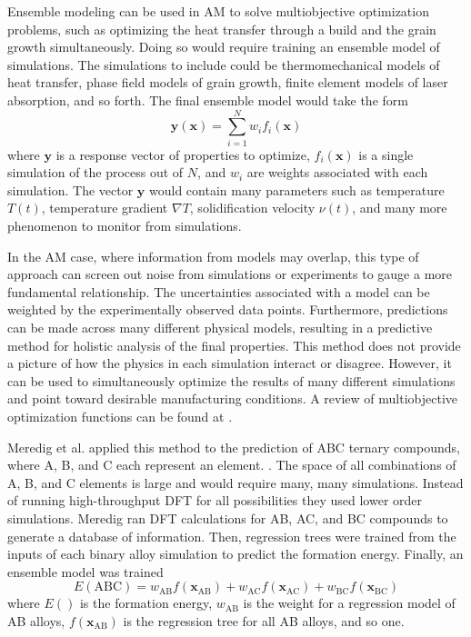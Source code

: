 Ensemble modeling can be used in AM to solve multiobjective optimization problems, such as optimizing the heat transfer through a build and the grain growth simultaneously. Doing so would require training an ensemble model of simulations. The simulations to include could be thermomechanical models of heat transfer, phase field models of grain growth, finite element models of laser absorption, and so forth. The final ensemble model would take the form
\begin{equation}
	\mathbf{y}(\mathbf{x}) = \sum_{i=1}^N w_i f_i(\mathbf{x})
	\label{ensemble}
\end{equation}
where $\mathbf{y}$ is a response vector of properties to optimize, $f_i(\mathbf{x})$ is a single simulation of the process out of $N$, and $w_i$ are weights associated with each simulation. The vector $\mathbf{y}$ would contain many parameters such as temperature $T(t)$, temperature gradient $\nabla T$, solidification velocity $\nu(t)$, and many more phenomenon to monitor from simulations. 

In the AM case, where information from models may overlap, this type of approach can screen out noise from simulations or experiments to gauge a more fundamental relationship. The uncertainties associated with a model can be weighted by the experimentally observed data points. Furthermore, predictions can be made across many different physical models, resulting in a predictive method for holistic analysis of the final properties. This method does not provide a picture of how the physics in each simulation interact or disagree. However, it can be used to simultaneously optimize the results of many different simulations and point toward desirable manufacturing conditions. A review of multiobjective optimization functions can be found at \cite{Jin2008}.

Meredig et al. applied this method to the prediction of ABC ternary compounds, where A, B, and C each represent an element. \cite{Meredig2014}. The space of all combinations of A, B, and C elements is large and would require many, many simulations. Instead of running high-throughput DFT for all possibilities they used lower order simulations. Meredig ran DFT calculations for AB, AC, and BC compounds to generate a database of information. Then, regression trees were trained from the inputs of each binary alloy simulation to predict the formation energy. Finally, an ensemble model was trained
\begin{equation}
	E(\text{ABC}) = w_{\text{AB}} f(\mathbf{x}_{\text{AB}}) + w_{\text{AC}} f(\mathbf{x}_{\text{AC}}) + w_{\text{BC}} f(\mathbf{x}_{\text{BC}})
	\label{dftensemble}
\end{equation}
where $E()$ is the formation energy, $w_\text{AB}$ is the weight for a regression model of AB alloys, $f(\mathbf{x}_{\text{AB}})$ is the regression tree for all AB alloys, and so one. 